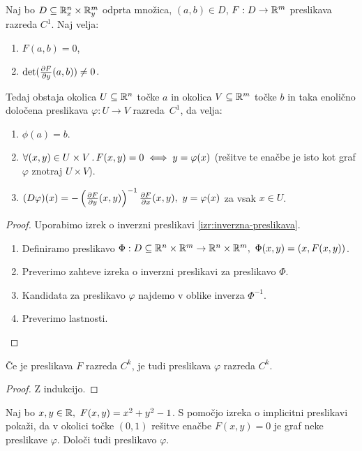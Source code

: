 \begin{izrek}
    Naj bo $D\subseteq \mathbb{R}_x^n \times \mathbb{R}_y^m$ odprta množica, $(a, b) \in D$, $F: D \to \mathbb{R}^m$ preslikava razreda $C^1$. Naj velja:
    \begin{enumerate}
        \item $F(a, b) = 0$,
        \item $\det(\frac{\partial F}{\partial y}(a,b)) \neq 0$.
    \end{enumerate}
    Tedaj obstaja okolica $U \subseteq \mathbb{R}^n$ točke $a$ in okolica $V \subseteq \mathbb{R}^m$ točke $b$ in taka enolično določena preslikava $\varphi: U \to V$ razreda~$C^1$, da velja:
    \begin{enumerate}
        \item $\phi(a) = b$.
        \item $\forall (x,y) \in U \times V \,.\, F(x,y) = 0 \iff y = \varphi(x)$ (rešitve te enačbe je isto kot graf $\varphi$ znotraj $U \times V$).
        \item $(D \varphi)(x) = - \left(\frac{\partial F}{\partial y}(x,y)\right)^{-1} \frac{\partial F}{\partial x}(x,y), \ y = \varphi(x)$ za vsak $x \in U$.
    \end{enumerate}
\end{izrek}

\begin{proof}
    Uporabimo izrek o inverzni preslikavi \ref{izr:inverzna-preslikava}. 

    \begin{enumerate}
        \item Definiramo preslikavo $\Phi: D \subseteq \mathbb{R}^n \times \mathbb{R}^m \to  \mathbb{R}^n \times \mathbb{R}^m, \ \Phi(x,y) = (x, F(x,y))$.
        \item Preverimo zahteve izreka o inverzni preslikavi za preslikavo \(\Phi\).
        \item Kandidata za preslikavo $\varphi$ najdemo v oblike inverza $\Phi^{-1}$.
        \item Preverimo lastnosti. \qedhere
    \end{enumerate}
\end{proof}

\begin{posledica}
    Če je preslikava $F$ razreda $C^k$, je tudi preslikava $\varphi$ razreda $C^k$.
\end{posledica}

\begin{proof}
    Z indukcijo.
\end{proof}

\begin{zgled}
    Naj bo $x,y \in \mathbb{R}, \ F(x, y) = x^2 + y^2 -1$. S pomočjo izreka o implicitni preslikavi pokaži, da v okolici točke $(0,1)$ rešitve enačbe $F(x,y) = 0$ je graf neke preslikave $\varphi$. Določi tudi preslikavo $\varphi$.
\end{zgled}

